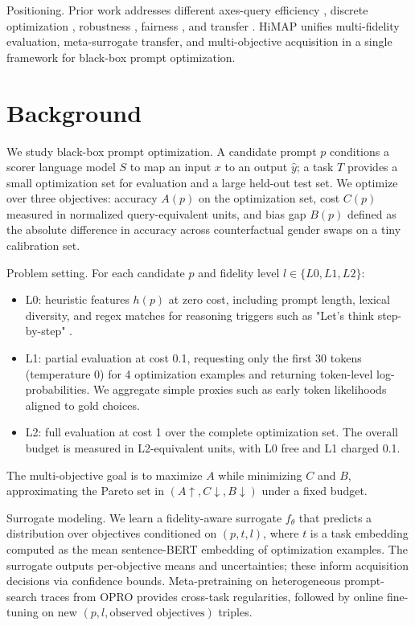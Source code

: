 \documentclass{article}
\begin{document}
Positioning. Prior work addresses different axes-query efficiency \cite{lin-2023-use,chen-2023-instructzero}, discrete optimization \cite{wen-2023-hard,wang-2024-discrete}, robustness \cite{arora-2022-ask,guha-2023-embroid}, fairness \cite{ma-2023-fairness}, and transfer \cite{phang-2022-hypertuning}. HiMAP unifies multi-fidelity evaluation, meta-surrogate transfer, and multi-objective acquisition in a single framework for black-box prompt optimization.

\section{Background}
We study black-box prompt optimization. A candidate prompt \(p\) conditions a scorer language model \(S\) to map an input \(x\) to an output \(\hat{y}\); a task \(T\) provides a small optimization set for evaluation and a large held-out test set. We optimize over three objectives: accuracy \(A(p)\) on the optimization set, cost \(C(p)\) measured in normalized query-equivalent units, and bias gap \(B(p)\) defined as the absolute difference in accuracy across counterfactual gender swaps on a tiny calibration set.

Problem setting. For each candidate \(p\) and fidelity level \(l \in \{L0, L1, L2\}\):
\begin{itemize}
  \item L0: heuristic features \(h(p)\) at zero cost, including prompt length, lexical diversity, and regex matches for reasoning triggers such as "Let's think step-by-step" \cite{kojima-2022-large}.
  \item L1: partial evaluation at cost 0.1, requesting only the first 30 tokens (temperature 0) for 4 optimization examples and returning token-level log-probabilities. We aggregate simple proxies such as early token likelihoods aligned to gold choices.
  \item L2: full evaluation at cost 1 over the complete optimization set. The overall budget is measured in L2-equivalent units, with L0 free and L1 charged 0.1.
\end{itemize}
The multi-objective goal is to maximize \(A\) while minimizing \(C\) and \(B\), approximating the Pareto set in \((A\!\uparrow, C\!\downarrow, B\!\downarrow)\) under a fixed budget.

Surrogate modeling. We learn a fidelity-aware surrogate \(f_{\theta}\) that predicts a distribution over objectives conditioned on \((p, t, l)\), where \(t\) is a task embedding computed as the mean sentence-BERT embedding of optimization examples. The surrogate outputs per-objective means and uncertainties; these inform acquisition decisions via confidence bounds. Meta-pretraining on heterogeneous prompt-search traces from OPRO \cite{yang-2023-large} provides cross-task regularities, followed by online fine-tuning on new \((p, l, \text{observed objectives})\) triples.
\end{document}
